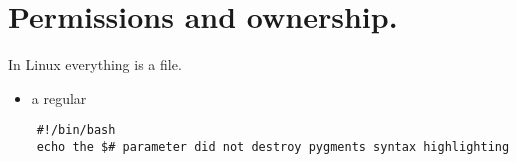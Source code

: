\documentclass{article}
\begin{document}
\section{Permissions and ownership.}
In Linux everything is a file.
\begin{itemize}
    \item a regular
\end{itemize}

    \begin{verbatim}
    #!/bin/bash
    echo the $# parameter did not destroy pygments syntax highlighting
    \end{verbatim}
\end{document}
